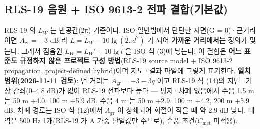 \documentclass[10pt,a4paper]{article}
\begin{document}
\subsection{RLS-19 음원 + ISO 9613-2 전파 결합(기본값)}
RLS-19 의 $L_W$ 는 반공간(2π) 기준이다. ISO 일반법에서 단단한 지면(G = 0)·근거리이면 $A_\mathrm{gr} = -3$ dB 라 $L = L_W - 10\lg(2\pi d^2)$ 가 되어 \textbf{가까운 거리에서는} 정의가 맞는다. 그래서 점음원 $L_W = L_W' + 10\lg l$ 을 ISO 식 (3)에 넣는다. 이 결합은 \textbf{어느 표준도 규정하지 않은 프로젝트 구성 방법}(RLS-19 source model + ISO 9613-2 propagation, project-defined hybrid)이며 지도·결과 파일에 그렇게 표기한다. \textbf{일치 범위(2026-11-11 검토)}: 먼 거리는 $A_\mathrm{gr} = -3 - 3q$ 이고 RLS-19 식 (14)의 지면·기상 감쇠(0–4.8 dB)가 없어 RLS-19 전파보다 높다 — 평지·차폐 없음에서 수음 1.5 m 는 50 m +4.0, 100 m +5.9 dB, 수음 4 m 는 50 m +2.9, 100 m +4.2, 200 m +5.9 dB. 차폐 경로는 ISO 식 (12)에서 $A_\mathrm{gr}$ 이 상쇄되어 회절이 작을 때 약 2.9 dB 낮다. 대역은 500 Hz 1개(RLS-19 가 A 가중 단일값만 주므로), 순풍 조건($C_\mathrm{met}$ 미적용).
\end{document}

